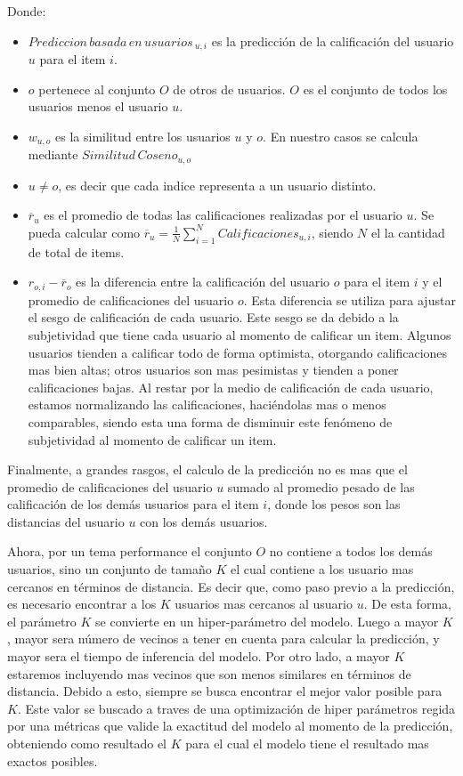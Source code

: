 \documentclass[11pt,a4paper,twoside]{thesis}
\begin{document}
\begin{description}
	\item[Donde:]
\end{description}
\begin{itemize}
	\item $Prediccion \mspace{3mu}basada \mspace{3mu}en \mspace{3mu}usuarios\mspace{3mu}_{u, i}$ es la predicción de la calificación del usuario $u$ para el item $i$.
	\item $o$ pertenece al conjunto $O$ de otros de usuarios. $O$ es el conjunto de todos los usuarios menos el usuario $u$.
	\item $w_{u,o}$ es la similitud entre los usuarios $u$ y $o$. En nuestro casos se calcula mediante $Similitud \mspace{3mu}Coseno_{u, o}$
	\item $u \neq o$, es decir que cada indice representa a un usuario distinto.
	\item $\overline{r}_{u}$ es el promedio de todas las calificaciones realizadas por el usuario $u$. Se pueda calcular como $\overline{r}_{u} = \frac{1}{N} \sum_{i=1}^N Calificaciones_{u,i}$, siendo $N$ el la cantidad de total de items.
	\item $r_{o,i} - \overline{r}_{o}$ es la diferencia entre la calificación del usuario $o$ para el item $i$ y el promedio de calificaciones del usuario $o$. Esta diferencia se utiliza para ajustar el sesgo de calificación de cada usuario. Este sesgo se da debido a la subjetividad que tiene cada usuario al momento de calificar un item. Algunos usuarios tienden a calificar todo de forma optimista, otorgando calificaciones mas bien altas; otros usuarios son mas pesimistas y tienden a poner calificaciones bajas. Al restar por la medio de calificación de cada usuario, estamos normalizando las calificaciones, haciéndolas mas o menos comparables, siendo esta una forma de disminuir este fenómeno de subjetividad al momento de calificar un item.
\end{itemize}

Finalmente, a grandes rasgos, el calculo de la predicción no es mas que el
promedio de calificaciones del usuario $u$ sumado al promedio pesado de las
calificación de los demás usuarios para el item $i$, donde los pesos son las
distancias del usuario $u$ con los demás usuarios.

Ahora, por un tema performance el conjunto $O$ no contiene a todos los demás
usuarios, sino un conjunto de tamaño $K$ el cual contiene a los usuario mas
cercanos en términos de distancia. Es decir que, como paso previo a la
predicción, es necesario encontrar a los $K$ usuarios mas cercanos al usuario
$u$. De esta forma, el parámetro $K$ se convierte en un hiper-parámetro del
modelo. Luego a mayor $K$, mayor sera número de vecinos a tener en cuenta para
calcular la predicción, y mayor sera el tiempo de inferencia del modelo. Por
otro lado, a mayor $K$ estaremos incluyendo mas vecinos que son menos similares
en términos de distancia. Debido a esto, siempre se busca encontrar el mejor
valor posible para $K$. Este valor se buscado a traves de una optimización de
hiper parámetros regida por una métricas que valide la exactitud del modelo al
momento de la predicción, obteniendo como resultado el $K$ para el cual el
modelo tiene el resultado mas exactos posibles.
\end{document}

